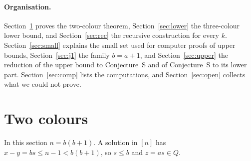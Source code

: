 \documentclass[11pt,a4paper]{article}
\theoremstyle{definition}
\theoremstyle{remark}
\begin{document}
\paragraph{Organisation.} Section~\ref{sec:R2} proves the two-colour theorem, Section~\ref{sec:lower} the three-colour lower bound, and Section~\ref{sec:rec} the recursive construction for every $k$. Section~\ref{sec:small} explains the small set used for computer proofs of upper bounds, Section~\ref{sec:j1} the family $b=a+1$, and Section~\ref{sec:upper} the reduction of the upper bound to Conjecture~S and of Conjecture~S to its lower part. Section~\ref{sec:comp} lists the computations, and Section~\ref{sec:open} collects what we could not prove.

\clearpage
\section{Two colours}\label{sec:R2}
In this section $n=b(b+1)$. A solution in $[n]$ has $x-y=bs\le n-1<b(b+1)$, so $s\le b$ and $z=as\in Q$.
\end{document}
